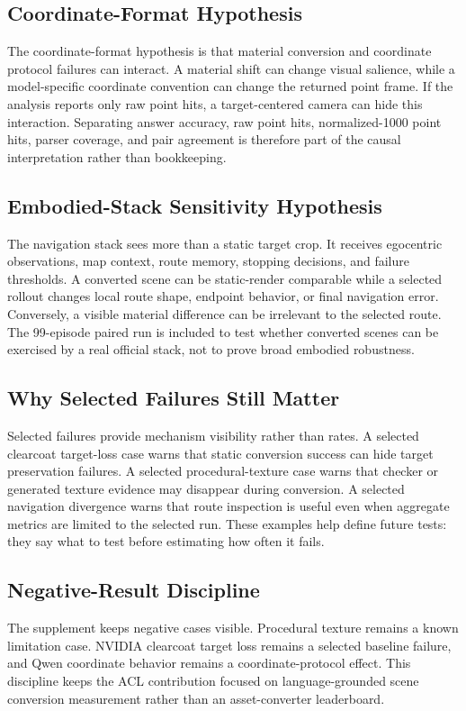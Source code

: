 \subsection{Coordinate-Format Hypothesis}

The coordinate-format hypothesis is that material conversion and coordinate
protocol failures can interact. A material shift can change visual salience,
while a model-specific coordinate convention can change the returned point
frame. If the analysis reports only raw point hits, a target-centered camera can
hide this interaction. Separating answer accuracy, raw point hits,
normalized-1000 point hits, parser coverage, and pair agreement is therefore
part of the causal interpretation rather than bookkeeping.

\subsection{Embodied-Stack Sensitivity Hypothesis}

The navigation stack sees more than a static target crop. It receives
egocentric observations, map context, route memory, stopping decisions, and
failure thresholds. A converted scene can be static-render comparable while a
selected rollout changes local route shape, endpoint behavior, or final
navigation error. Conversely, a visible material difference can be irrelevant
to the selected route. The 99-episode paired run is included to test whether
converted scenes can be exercised by a real official stack, not to prove broad
embodied robustness.

\subsection{Why Selected Failures Still Matter}

Selected failures provide mechanism visibility rather than rates. A selected
clearcoat target-loss case warns that static conversion
success can hide target preservation failures. A selected procedural-texture
case warns that checker or generated texture evidence may disappear during
conversion. A selected navigation divergence warns that route inspection is
useful even when aggregate metrics are limited to the selected run. These examples help define
future tests: they say what to test before estimating how often it fails.

\subsection{Negative-Result Discipline}

The supplement keeps negative cases visible. Procedural texture remains a
known limitation case. NVIDIA clearcoat target loss remains a selected baseline
failure, and Qwen coordinate behavior remains a coordinate-protocol effect.
This discipline keeps the ACL contribution focused on language-grounded scene
conversion measurement rather than an asset-converter leaderboard.
